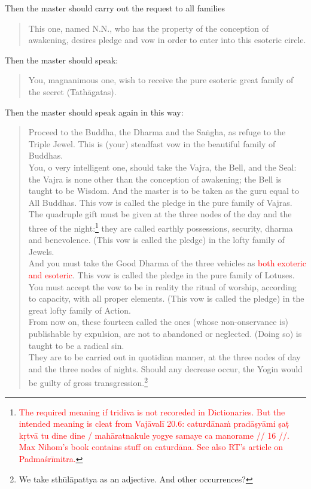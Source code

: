 \documentclass[11pt]{book}
\newcommand{\red}[1]{\textcolor{red}{#1}}
\begin{document}
Then the master should carry out the request to all families

\begin{verse}
This one, named N.N., who has the property of the conception of awakening, desires pledge and vow in order to enter into this esoteric circle.
\end{verse}

Then the master should speak:

\begin{verse}
You, magnanimous one, wish to receive the pure esoteric great family of the secret (Tathāgatas).
\end{verse}

Then the master should speak again in this way:

\begin{verse}
Proceed to the Buddha, the Dharma and the Saṅgha, as refuge to the Triple Jewel. This is (your) steadfast vow in the beautiful family of Buddhas.\\
You, o very intelligent one, should take the Vajra, the Bell, and the Seal: the Vajra is none other than the conception of awakening; the Bell is taught to be Wisdom. And the master is to be taken as the guru equal to All Buddhas. This vow is called the pledge in the pure family of Vajras.\\
The quadruple gift must be given at the three nodes of the day and the three of the night:\footnote{\red{The required meaning if tridiva is not recoreded in Dictionaries. But the intended meaning is cleat from Vajāvalī 20.6: caturdānaṁ pradāṣyāmi ṣaṭ kṛtvā tu dine dine / mahāratnakule yogye samaye ca manorame // 16 //. Max Nihom's book contains stuff on caturdāna. See also RT's article on Padmaśrīmitra.}} they are called earthly possessions, security, dharma and benevolence. (This vow is called the pledge) in the lofty family of Jewels.\\
And you must take the Good Dharma of the three vehicles as \red{both exoteric and esoteric}. This vow is called the pledge in the pure family of Lotuses.\\
You must accept the vow to be in reality the ritual of worship, according to capacity, with all proper elements. (This vow is called the pledge) in the great lofty family of Action.\\
From now on, these fourteen called the ones (whose non-onservance is) publishable by expulsion, are not to abandoned or neglected. (Doing so) is taught to be a radical sin.\\
They are to be carried out in quotidian manner, at the three nodes of day and the three nodes of nights. Should any decrease occur, the Yogin would be guilty of gross transgression.\footnote{We take sthūlāpattya as an adjective. And other occurrences?}\\

\end{verse}
\end{document}
